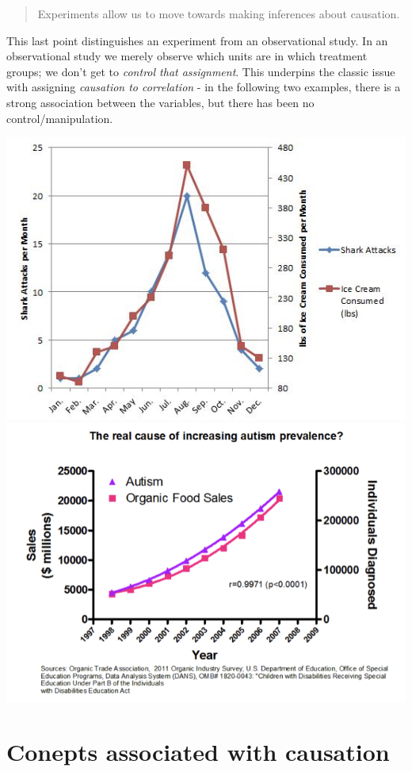 \documentclass[
]{book}
\begin{document}
\begin{quote}
Experiments allow us to move towards making inferences about causation.
\end{quote}

This last point distinguishes an experiment from an observational study. In an observational study we merely observe which units are in which treatment groups; we don't get to \emph{control that assignment}. This underpins the classic issue with assigning \emph{causation to correlation} - in the following two examples, there is a strong association between the variables, but there has been no control/manipulation.

\includegraphics[width=7.44in]{images/IceCream_Shark}
\includegraphics[width=8.89in]{images/Autism_Organic}

\hypertarget{conepts-associated-with-causation}{%
\section{Conepts associated with causation}\label{conepts-associated-with-causation}}
\end{document}
